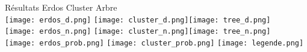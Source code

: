 \documentclass[11pt]{bredelebeamer}
\begin{document}
 \begin{frame}{Résultats}
\hspace{1cm} Erdos \hspace{0.25\textwidth} Cluster \hspace{0.25\textwidth} Arbre\\
 \noindent
\texttt{[image: erdos\_d.png]}\hspace{1cm}
\texttt{[image: cluster\_d.png]}\hspace{1cm}\texttt{[image: tree\_d.png]}\\[2em]

\texttt{[image: erdos\_n.png]}\hspace{1cm}
\texttt{[image: cluster\_n.png]}\hspace{1cm}\texttt{[image: tree\_n.png]}\\[2em]
\texttt{[image: erdos\_prob.png]}\hspace{1cm}
\texttt{[image: cluster\_prob.png]}
\hspace{1cm}    \texttt{[image: legende.png]}\par

\end{frame}
\end{document}
